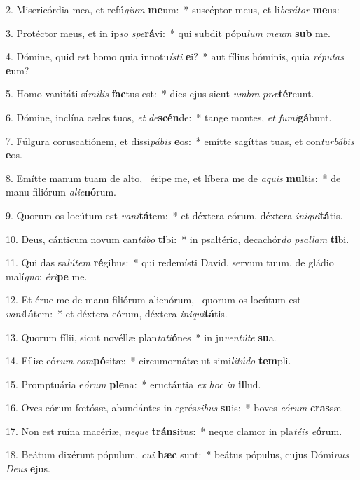 2. Misericórdia mea, et refú\textit{gi}\textit{um} \textbf{me}um:~*  suscéptor meus, et li\textit{be}\textit{rá}\textit{tor} \textbf{me}us:\

3. Protéctor meus, et in ip\textit{so} \textit{spe}\textbf{rá}vi:~*  qui subdit pópu\textit{lum} \textit{me}\textit{um} \textbf{sub} me.\

4. Dómine, quid est homo quia innotu\textit{ís}\textit{ti} \textbf{e}i?~*  aut fílius hóminis, quia \textit{ré}\textit{pu}\textit{tas} \textbf{e}um?\

5. Homo vanitáti sí\textit{mi}\textit{lis} \textbf{fac}tus est:~*  dies ejus sicut \textit{um}\textit{bra} \textit{præ}\textbf{tér}eunt.\

6. Dómine, inclína cælos tuos, \textit{et} \textit{de}\textbf{scén}de:~*  tange montes, \textit{et} \textit{fu}\textit{mi}\textbf{gá}bunt.\

7. Fúlgura coruscatiónem, et dissi\textit{pá}\textit{bis} \textbf{e}os:~*  emítte sagíttas tuas, et con\textit{tur}\textit{bá}\textit{bis} \textbf{e}os.\

8. Emítte manum tuam de alto, \dag\  éripe me, et líbera me de \textit{a}\textit{quis} \textbf{mul}tis:~*  de manu filiórum \textit{a}\textit{li}\textit{e}\textbf{nó}rum.\

9. Quorum os locútum est \textit{va}\textit{ni}\textbf{tá}tem:~*  et déxtera eórum, déxtera \textit{in}\textit{i}\textit{qui}\textbf{tá}tis.\

10. Deus, cánticum novum can\textit{tá}\textit{bo} \textbf{ti}bi:~*  in psaltério, decachór\textit{do} \textit{psal}\textit{lam} \textbf{ti}bi.\

11. Qui das sa\textit{lú}\textit{tem} \textbf{ré}gibus:~*  qui redemísti David, servum tuum, de gládio malí\textit{gno}: \textit{é}\textit{ri}\textbf{pe} me.\

12. Et érue me de manu filiórum alienórum, \dag\  quorum os locútum est \textit{va}\textit{ni}\textbf{tá}tem:~*  et déxtera eórum, déxtera \textit{in}\textit{i}\textit{qui}\textbf{tá}tis.\

13. Quorum fílii, sicut novéllæ plan\textit{ta}\textit{ti}\textbf{ó}nes~*  in ju\textit{ven}\textit{tú}\textit{te} \textbf{su}a.\

14. Fíliæ eó\textit{rum} \textit{com}\textbf{pó}sitæ:~*  circumornátæ ut simi\textit{li}\textit{tú}\textit{do} \textbf{tem}pli.\

15. Promptuária e\textit{ó}\textit{rum} \textbf{ple}na:~*  eructántia \textit{ex} \textit{hoc} \textit{in} \textbf{il}lud.\

16. Oves eórum fœtósæ, abundántes in egrés\textit{si}\textit{bus} \textbf{su}is:~*  boves \textit{e}\textit{ó}\textit{rum} \textbf{cras}sæ.\

17. Non est ruína macériæ, \textit{ne}\textit{que} \textbf{tráns}itus:~*  neque clamor in pla\textit{té}\textit{is} \textit{e}\textbf{ó}rum.\

18. Beátum dixérunt pópulum, \textit{cu}\textit{i} \textbf{hæc} sunt:~*  beátus pópulus, cujus Dómi\textit{nus} \textit{De}\textit{us} \textbf{e}jus.\

